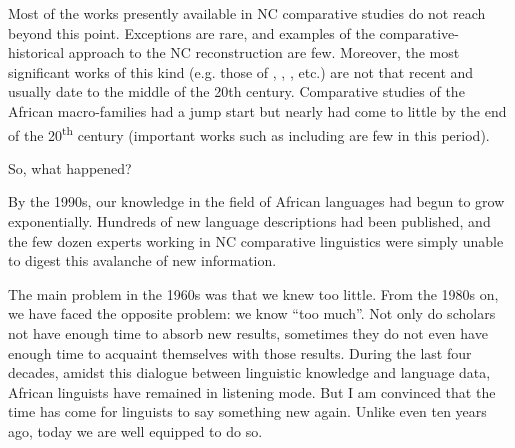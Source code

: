 \begin{table}
\end{table}



Most of the works presently available in NC comparative studies do not reach beyond this point. Exceptions are rare, and examples of the comparative-historical approach to the NC reconstruction are few. Moreover, the most significant works of this kind (e.g. those of \citealt{Westermann1927}, \citealt{Greenberg1966}, \citealt{Sebeok1971}, etc.) are not that recent and usually date to the middle of the 20th century. Comparative studies of the African macro-families had a jump start but nearly had come to little by the end of the 20\textsuperscript{th} century (important works such as  \citealt{Bendor-Samuel1989} including \citealt{Williamson1988,Williamson1989a} are few in this period).

So, what happened? 

By the 1990s, our knowledge in the field of African languages had begun to grow exponentially. Hundreds of new language descriptions had been published, and the few dozen experts working in NC comparative linguistics were simply unable to digest this avalanche of new information. 

The main problem in the 1960s was that we knew too little. From the 1980s on, we have faced the opposite problem: we know “too much”. Not only do scholars not have enough time to absorb new results, sometimes they do not even have enough time to acquaint themselves with those results. During the last four decades, amidst this dialogue between linguistic knowledge and language data, African linguists have remained in listening mode. But I am convinced that the time has come for linguists to say something new again. Unlike even ten years ago, today we are well equipped to do so.

